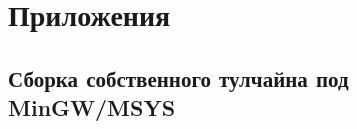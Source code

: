 

\maketitle
\tableofcontents
\listoflab

% 
% 
% 
% 
% 
% 
% 
% 

\part{Приложения}
\chapter{Сборка собственного тулчайна под MinGW/MSYS}




